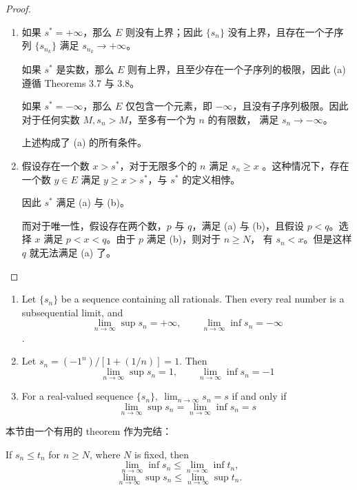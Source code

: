 \documentclass[../poma-notes.tex]{subfiles}
\begin{document}
\begin{proof}
  \begin{enumerate}[label=(\alph*)]
    \item 如果 $s^* = + \infty$，那么 $E$ 则没有上界；因此 $\{s_n\}$ 没有上界，且存在一个子序列 $\{s_{n_k}\}$ 满足 $s_{n_k} \to + \infty$。

          如果 $s^*$ 是实数，那么 $E$ 则有上界，且至少存在一个子序列的极限，因此 (a) 遵循 Theorems 3.7 与 3.8。

          如果 $s^* = - \infty$，那么 $E$ 仅包含一个元素，即 $- \infty$，且没有子序列极限。因此对于任何实数 $M, s_n > M$，至多有一个为 $n$ 的有限数，
          满足 $s_n \to - \infty$。

          上述构成了 (a) 的所有条件。
    \item 假设存在一个数 $x > s^*$，对于无限多个的 $n$ 满足 $s_n \ge x$ 。这种情况下，存在一个数 $y \in E$ 满足 $y \ge x > s^*$，与 $s^*$ 的定义相悖。

          因此 $s^*$ 满足 (a) 与 (b)。

          而对于唯一性，假设存在两个数，$p$ 与 $q$，满足 (a) 与 (b)，且假设 $p < q$。选择 $x$ 满足 $p < x < q$。由于 $p$ 满足 (b)，则对于 $n \ge N$，
          有 $s_n < x$。但是这样 $q$ 就无法满足 (a) 了。
  \end{enumerate}
\end{proof}


\begin{examples}\mbox{}
  \begin{enumerate}[label=(\alph*)]
    \item Let $\{s_n\}$ be a sequence containing all rationals. Then every real number is a subsequential limit, and
          \[ \lim_{n \to \infty} \sup s_n = + \infty, \qquad \lim_{n \to \infty} \inf s_n = - \infty \].
    \item Let $s_n = (-1^n)/[1+(1/n)] = 1$. Then
          \[ \lim_{n \to \infty} \sup s_n = 1, \qquad \lim_{n \to \infty} \inf s_n = -1 \]
    \item For a real-valued sequence $\{s_n\},\ \lim_{n \to \infty} s_n = s$ if and only if
          \[ \lim_{n \to \infty} \sup s_n = \lim_{n \to \infty} \inf s_n = s \]
  \end{enumerate}
\end{examples}

本节由一个有用的 theorem 作为完结：

\begin{theorem}
  If $s_n \le t_n$ for $n \ge N$, where $N$ is fixed, then
  \[ \lim_{n \to \infty} \inf s_n \le \lim_{n \to \infty} \inf t_n, \]
  \[ \lim_{n \to \infty} \sup s_n \le \lim_{n \to \infty} \sup t_n. \]
\end{theorem}
\end{document}
